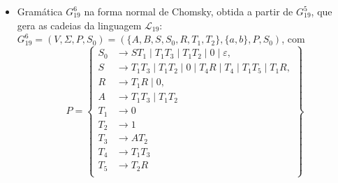 \documentclass[12pt]{article}
\def\myling{{19}} %
\newcommand{\ve}{\ensuremath{\varepsilon}}
\begin{document}
\begin{tcolorbox}[breakable,rounded corners, colback=yellow!5, colframe=red!40!black, title={Forma normal de Chomsky.}]
\begin{itemize}
  \item Gramática $G_{\myling}^6$ na forma normal de Chomsky, obtida a partir de $G_{\myling}^5$, que gera as cadeias da linguagem $\mathcal{L}_{\myling}$:\\
  $G_{\myling}^6=(V,\Sigma,P,S_0)=(\{A,B,S,S_0,R,T_1,T_2\},\{a,b\},P,S_0)$, com
    \[P=\left\{
     \begin{aligned}
      S_0 & \to ST_1\mid T_1T_3 \mid T_1T_2 \mid 0 \mid \ve,\\
      S & \to T_1T_3 \mid T_1T_2 \mid 0 \mid T_4R \mid T_4 \mid T_1T_5 \mid T_1R, \\
      R & \to T_1R \mid 0, \\
      A & \to T_1T_3 \mid T_1T_2 \\
      T_1 &\to 0\\
      T_2 &\to 1\\
      T_3 &\to AT_2\\
      T_4 &\to T_1T_3\\
      T_5 &\to T_2R\\
     \end{aligned}
    \right\}\]
\end{itemize}
\end{tcolorbox}
\end{document}
